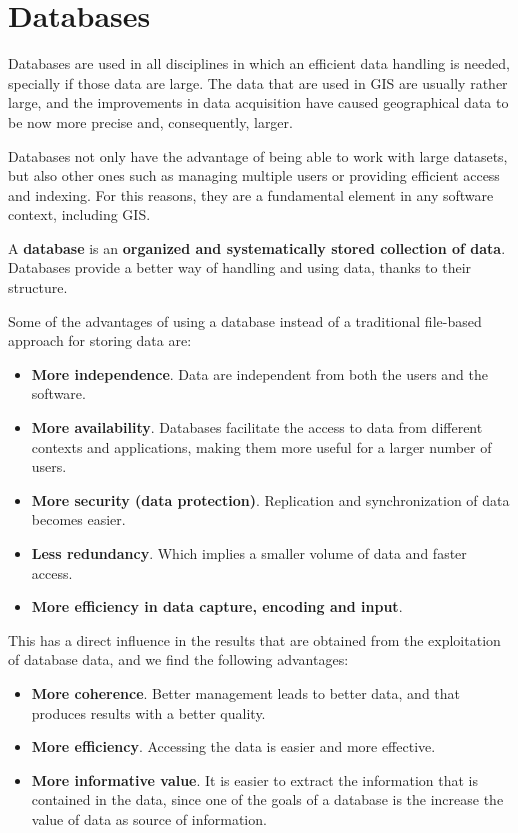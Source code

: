 \chapter{Databases}

\pagestyle{fancy}

Databases are used in all disciplines in which an efficient data handling is needed, specially if those data are large. The data that are used in GIS are usually rather large, and the improvements in data acquisition have caused geographical data to be now more precise and, consequently, larger. 

Databases not only have the advantage of being able to work with large datasets, but also other ones such as managing multiple users or providing efficient access and indexing. For this reasons, they are a fundamental element in any software context, including GIS.

A \textbf{database} is an \textbf{organized and systematically stored collection of data}. Databases provide a better way of handling and using data, thanks to their structure.

Some of the advantages of using a database instead of a traditional file-based approach for storing data are:

\begin{itemize}
	\item \textbf{More independence}. Data are independent from both the users and the software.
	\item \textbf{More availability}. Databases facilitate the access to data from different contexts and applications, making them more useful for a larger number of users.
	\item \textbf{More security (data protection)}. Replication and synchronization of data becomes easier.
	\item \textbf{Less redundancy}. Which implies a smaller volume of data and faster access.
	\item \textbf{More efficiency in data capture, encoding and input}.
\end{itemize}

This has a direct influence in the results that are obtained from the exploitation of database data, and we find the following advantages:

\begin{itemize}
	\item \textbf{More coherence}. Better management leads to better data, and that produces results with a better quality.
	\item \textbf{More efficiency}. Accessing the data is easier and more effective.
	\item \textbf{More informative value}. It is easier to extract the information that is contained in the data, since one of the goals of a database is the increase the value of data as source of information.
\end{itemize}

